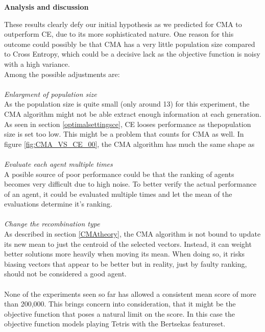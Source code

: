 
\textbf{Analysis and discussion}

These results clearly defy our initial hypothesis as we predicted
for CMA to outperform CE, due to its more sophisticated nature. 
One reason for this outcome could possibly be that
CMA has a very little population size compared to Cross Entropy,
which could be a decisive lack as the objective function is noisy with 
a high variance.\\

Among the possible adjustments are:\\
\\
\textit{Enlargment of population size}\\
As the population size is quite small (only around 13)
for this experiment, the CMA algorithm might not be able
extract enough information at each generation. As seen in 
section \ref{optimalsettingsce}, CE looses performance as 
thepopulation size is set too low. This might be a problem 
that counts for CMA as well. In figure \ref{fig:CMA_VS_CE_00},
the CMA algorithm has much the same shape as \\
\\
\textit{Evaluate each agent multiple times}\\
A posible source of poor performance could be 
that the ranking of agents becomes very difficult
due to high noise. To better verify the actual
performance of an agent, it could be evaluated 
multiple times and let the mean of the evaluations
determine it's ranking.\\
\\
\textit{Change the recombination type}\\
As described in section \ref{CMAtheory}, 
the CMA algorithm is not bound to update its 
new mean to just the centroid of the selected 
vectors. Instead, it can weight better solutions
more heavily when moving its mean. When doing so,
it risks biasing vectors that appear to be better 
but in reality, just by faulty ranking, should
not be considered a good agent.\\
\\
None of the experiments seen so far has allowed a 
consistent mean score of more 
than 200,000. This brings concern into 
consideration, that it might be the objective function
that poses a natural limit on the score.
In this case the objective function
models playing Tetris with the Bertsekas featureset. 
